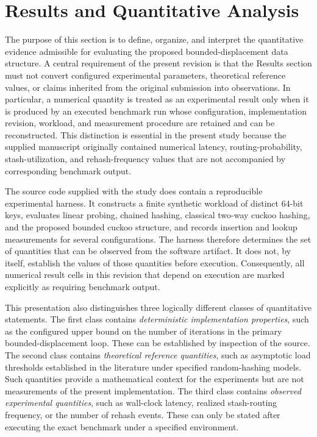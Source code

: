 \documentclass[conference]{IEEEtran}
\begin{document}

\section{Results and Quantitative Analysis}
\label{sec:results}

The purpose of this section is to define, organize, and interpret the quantitative evidence admissible for evaluating the proposed bounded-displacement data structure. A central requirement of the present revision is that the Results section must not convert configured experimental parameters, theoretical reference values, or claims inherited from the original submission into observations. In particular, a numerical quantity is treated as an experimental result only when it is produced by an executed benchmark run whose configuration, implementation revision, workload, and measurement procedure are retained and can be reconstructed. This distinction is essential in the present study because the supplied manuscript originally contained numerical latency, routing-probability, stash-utilization, and rehash-frequency values that are not accompanied by corresponding benchmark output.

The source code supplied with the study does contain a reproducible experimental harness. It constructs a finite synthetic workload of distinct 64-bit keys, evaluates linear probing, chained hashing, classical two-way cuckoo hashing, and the proposed bounded cuckoo structure, and records insertion and lookup measurements for several configurations. The harness therefore determines the set of quantities that can be observed from the software artifact. It does not, by itself, establish the values of those quantities before execution. Consequently, all numerical result cells in this revision that depend on execution are marked explicitly as requiring benchmark output.

This presentation also distinguishes three logically different classes of quantitative statements. The first class contains \emph{deterministic implementation properties}, such as the configured upper bound on the number of iterations in the primary bounded-displacement loop. These can be established by inspection of the source. The second class contains \emph{theoretical reference quantities}, such as asymptotic load thresholds established in the literature under specified random-hashing models. Such quantities provide a mathematical context for the experiments but are not measurements of the present implementation. The third class contains \emph{observed experimental quantities}, such as wall-clock latency, realized stash-routing frequency, or the number of rehash events. These can only be stated after executing the exact benchmark under a specified environment.
\end{document}
